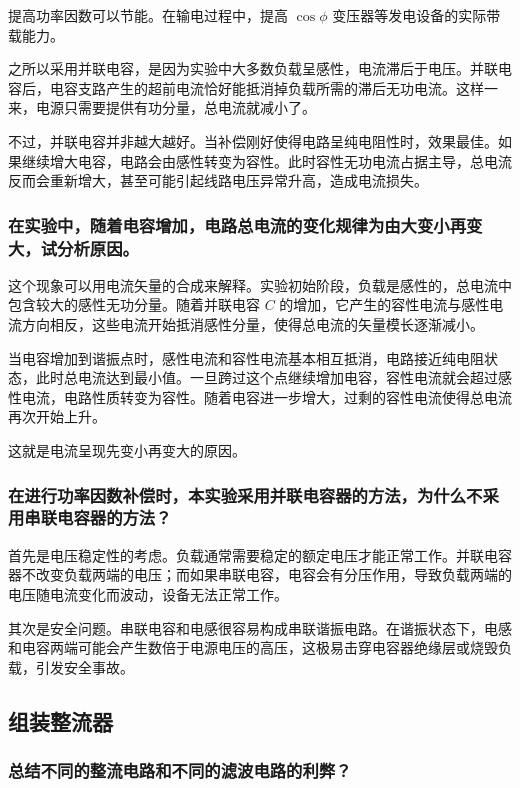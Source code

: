 \documentclass{../template/Report}%
\begin{document}
\begin{fullreportonly}
    提高功率因数可以节能。在输电过程中，提高 $\cos\phi$ 变压器等发电设备的实际带载能力。

    之所以采用并联电容，是因为实验中大多数负载呈感性，电流滞后于电压。并联电容后，电容支路产生的超前电流恰好能抵消掉负载所需的滞后无功电流。这样一来，电源只需要提供有功分量，总电流就减小了。

    不过，并联电容并非越大越好。当补偿刚好使得电路呈纯电阻性时，效果最佳。如果继续增大电容，电路会由感性转变为容性。此时容性无功电流占据主导，总电流反而会重新增大，甚至可能引起线路电压异常升高，造成电流损失。

    \subsubsection{在实验中，随着电容增加，电路总电流的变化规律为由大变小再变大，试分析原因。}

    这个现象可以用电流矢量的合成来解释。实验初始阶段，负载是感性的，总电流中包含较大的感性无功分量。随着并联电容 $C$ 的增加，它产生的容性电流与感性电流方向相反，这些电流开始抵消感性分量，使得总电流的矢量模长逐渐减小。

    当电容增加到谐振点时，感性电流和容性电流基本相互抵消，电路接近纯电阻状态，此时总电流达到最小值。一旦跨过这个点继续增加电容，容性电流就会超过感性电流，电路性质转变为容性。随着电容进一步增大，过剩的容性电流使得总电流再次开始上升。

    这就是电流呈现先变小再变大的原因。

    \subsubsection{在进行功率因数补偿时，本实验采用并联电容器的方法，为什么不采用串联电容器的方法？}

    首先是电压稳定性的考虑。负载通常需要稳定的额定电压才能正常工作。并联电容器不改变负载两端的电压；而如果串联电容，电容会有分压作用，导致负载两端的电压随电流变化而波动，设备无法正常工作。

    其次是安全问题。串联电容和电感很容易构成串联谐振电路。在谐振状态下，电感和电容两端可能会产生数倍于电源电压的高压，这极易击穿电容器绝缘层或烧毁负载，引发安全事故。

    \subsection{组装整流器}

    \subsubsection{总结不同的整流电路和不同的滤波电路的利弊？}


\end{fullreportonly}
\end{document}
